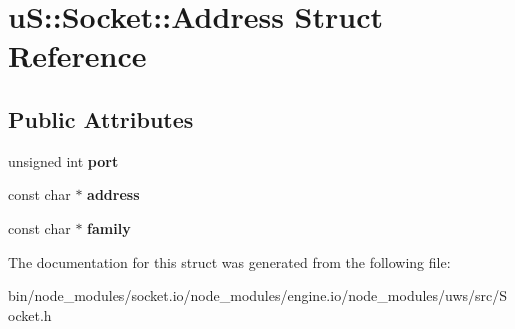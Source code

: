 \hypertarget{structu_s_1_1_socket_1_1_address}{}\section{uS\+:\+:Socket\+:\+:Address Struct Reference}
\label{structu_s_1_1_socket_1_1_address}
\subsection*{Public Attributes}
\begin{DoxyCompactItemize}
\item 
\mbox{\label{structu_s_1_1_socket_1_1_address_af67cd32ef387050c9efb9bbc52874fd2}} 
unsigned int {\bfseries port}
\item 
\mbox{\label{structu_s_1_1_socket_1_1_address_a949c31d62265b47d35f3f3351fee9f27}} 
const char $\ast$ {\bfseries address}
\item 
\mbox{\label{structu_s_1_1_socket_1_1_address_a9f8156ea3d8703c87f19881db575fd14}} 
const char $\ast$ {\bfseries family}
\end{DoxyCompactItemize}


The documentation for this struct was generated from the following file\+:\begin{DoxyCompactItemize}
\item 
bin/node\+\_\+modules/socket.\+io/node\+\_\+modules/engine.\+io/node\+\_\+modules/uws/src/Socket.\+h\end{DoxyCompactItemize}
